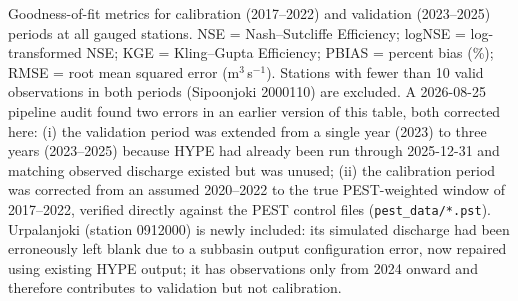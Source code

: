\documentclass[draft]{agujournal2019}
\begin{document}
\begin{table}[p]
\caption{Goodness-of-fit metrics for calibration (2017--2022) and validation (2023--2025) periods at all gauged stations. NSE = Nash--Sutcliffe Efficiency; logNSE = log-transformed NSE; KGE = Kling--Gupta Efficiency; PBIAS = percent bias (\%); RMSE = root mean squared error (m$^3$\,s$^{-1}$). Stations with fewer than 10 valid observations in both periods (Sipoonjoki 2000110) are excluded. A 2026-08-25 pipeline audit found two errors in an earlier version of this table, both corrected here: (i) the validation period was extended from a single year (2023) to three years (2023--2025) because HYPE had already been run through 2025-12-31 and matching observed discharge existed but was unused; (ii) the calibration period was corrected from an assumed 2020--2022 to the true PEST-weighted window of 2017--2022, verified directly against the PEST control files (\texttt{pest\_data/*.pst}). Urpalanjoki (station 0912000) is newly included: its simulated discharge had been erroneously left blank due to a subbasin output configuration error, now repaired using existing HYPE output; it has observations only from 2024 onward and therefore contributes to validation but not calibration.}
\label{tab:gof}


\end{table}
\end{document}
